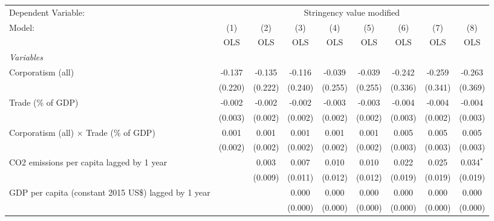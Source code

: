 
\begingroup
\centering
\begin{tabular}{lcccccccc}
   \toprule
   Dependent Variable: & \multicolumn{8}{c}{Stringency value modified}\\
   Model:                                                    & (1)     & (2)     & (3)     & (4)     & (5)     & (6)          & (7)           & (8)\\  
                                                             &  OLS    & OLS     & OLS     & OLS     & OLS     & OLS          & OLS           & OLS\\  
   \midrule
   \emph{Variables}\\
   Corporatism (all)                                         & -0.137  & -0.135  & -0.116  & -0.039  & -0.039  & -0.242       & -0.259        & -0.263\\   
                                                             & (0.220) & (0.222) & (0.240) & (0.255) & (0.255) & (0.336)      & (0.341)       & (0.369)\\   
   Trade (\% of GDP)                                         & -0.002  & -0.002  & -0.002  & -0.003  & -0.003  & -0.004       & -0.004        & -0.004\\   
                                                             & (0.003) & (0.002) & (0.002) & (0.002) & (0.002) & (0.003)      & (0.002)       & (0.003)\\   
   Corporatism (all) $\times$ Trade (\% of GDP)              & 0.001   & 0.001   & 0.001   & 0.001   & 0.001   & 0.005        & 0.005         & 0.005\\   
                                                             & (0.002) & (0.002) & (0.002) & (0.002) & (0.002) & (0.003)      & (0.003)       & (0.003)\\   
   CO2 emissions per capita lagged by 1 year                 &         & 0.003   & 0.007   & 0.010   & 0.010   & 0.022        & 0.025         & 0.034$^{*}$\\   
                                                             &         & (0.009) & (0.011) & (0.012) & (0.012) & (0.019)      & (0.019)       & (0.019)\\   
   GDP per capita (constant 2015 US\$) lagged by 1 year      &         &         & 0.000   & 0.000   & 0.000   & 0.000        & 0.000         & 0.000\\   
                                                             &         &         & (0.000) & (0.000) & (0.000) & (0.000)      & (0.000)       & (0.000)\\   

\end{tabular}
